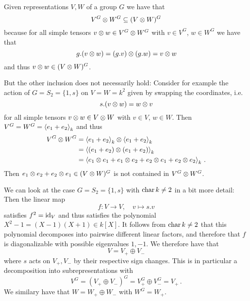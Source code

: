 \begin{remark}
  Given representations $V, W$ of a group $G$ we have that
  \[
              V^G \mathbin{\otimes} W^G
    \subseteq (V \mathbin{\otimes} W)^G
  \]
  because for all simple tensors $v \mathbin{\otimes} w \in V^G \mathbin{\otimes} W^G$ with $v \in V^G$, $w \in W^G$ we have that
  \[
      g.(v \mathbin{\otimes} w)
    = (g.v) \mathbin{\otimes} (g.w)
    = v \mathbin{\otimes} w
  \]
  and thus $v \mathbin{\otimes} w \in (V \mathbin{\otimes} W)^G$.
  
  But the other inclusion does not necessarily hold:
  Consider for example the action of $G = S_2 = \{1, s\}$ on $V = W = k^2$ given by swapping the coordinates, i.e.\
  \[
      s.(v \mathbin{\otimes} w)
    = w \mathbin{\otimes} v
  \]
  for all simple tensors $v \mathbin{\otimes} w \in V \mathbin{\otimes} W$ with $v \in V$, $w \in W$.
  Then $V^G = W^G = \left\langle  e_1 + e_2  \right\rangle_k$ and thus
  \begin{align*}
        V^G \mathbin{\otimes} W^G
    &=  \left\langle  e_1 + e_2  \right\rangle_k \mathbin{\otimes} \left\langle  e_1 + e_2  \right\rangle_k \\
    &=  \left\langle  (e_1 + e_2) \mathbin{\otimes} (e_1 + e_2)  \right\rangle_k       \\
    &=  \left\langle  e_1 \mathbin{\otimes} e_1 + e_1 \mathbin{\otimes} e_2 + e_2 \mathbin{\otimes} e_1 + e_2 \mathbin{\otimes} e_2  \right\rangle_k \,.
  \end{align*}
  Then $e_1 \mathbin{\otimes} e_2 + e_2 \mathbin{\otimes} e_1 \in (V \mathbin{\otimes} W)^G$ is not contained in $V^G \mathbin{\otimes} W^G$.
  
  We can look at the case $G = S_2 = \{1, s\}$ with $\operatorname{char} k \neq 2$ in a bit more detail:
  Then the linear map
  \[
            f
    \colon  V
    \to     V,
    \quad   v
    \mapsto s.v
  \]
  satisfies $f^2 = \operatorname{id}_V$ and thus satisfies the polynomial $X^2 - 1 = (X-1)(X+1) \in k[X]$.
  It follows from $\operatorname{char} k \neq 2$ that this polynomial decomposes into pairwise different linear factors, and therefore that $f$ is diagonalizable with possible eigenvalues $1, -1$.
  We therefore have that
  \[
      V
    = V_+ \oplus V_-
  \]
  where $s$ acts on $V_+, V_-$ by their respective sign changes.
  This is in particular a decomposition into subrepresentations with
  \[
      V^G
    = (V_+ \oplus V_-)^G
    = V_+^G \oplus V_-^G
    = V_+ \,.
  \]
  We similary have that $W = W_+ \oplus W_-$ with $W^G = W_+$.
  

\end{remark}
